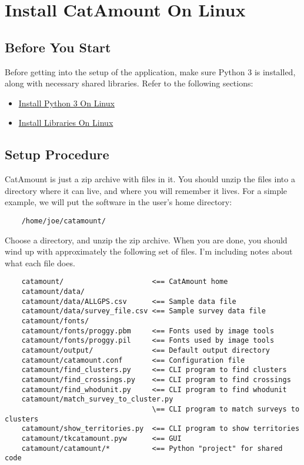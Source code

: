 \chapter{Install CatAmount On Linux}
\hypertarget{linux-install-catamount}{}

\section{Before You Start}

Before getting into the setup of the application, make sure Python 3
is installed, along with necessary shared libraries. Refer to the
following sections:

\begin{itemize}
\item \hyperlink{linux-install-python}{Install Python 3 On Linux}
\item \hyperlink{linux-install-libraries}{Install Libraries On Linux}
\end{itemize}

\section{Setup Procedure}

CatAmount is just a zip archive with files in it. You should unzip
the files into a directory where it can live, and where you will
remember it lives. For a simple example, we will put the software
in the user's home directory:

\begin{verbatim}
    /home/joe/catamount/
\end{verbatim}

Choose a directory, and unzip the zip archive. When you are done,
you should wind up with approximately the following set of files.
I'm including notes about what each file does.

\begin{verbatim}
    catamount/                     <== CatAmount home
    catamount/data/
    catamount/data/ALLGPS.csv      <== Sample data file
    catamount/data/survey_file.csv <== Sample survey data file
    catamount/fonts/
    catamount/fonts/proggy.pbm     <== Fonts used by image tools
    catamount/fonts/proggy.pil     <== Fonts used by image tools
    catamount/output/              <== Default output directory
    catamount/catamount.conf       <== Configuration file
    catamount/find_clusters.py     <== CLI program to find clusters
    catamount/find_crossings.py    <== CLI program to find crossings
    catamount/find_whodunit.py     <== CLI program to find whodunit
    catamount/match_survey_to_cluster.py
                                   \== CLI program to match surveys to clusters
    catamount/show_territories.py  <== CLI program to show territories
    catamount/tkcatamount.pyw      <== GUI
    catamount/catamount/*          <== Python "project" for shared code
\end{verbatim}

